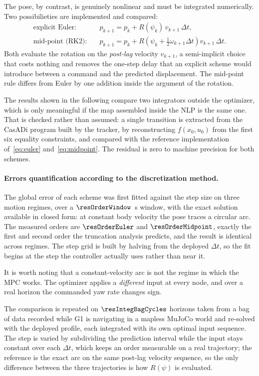 \documentclass[11pt,a4paper]{article}
\begin{document}
The pose, by contrast, is genuinely nonlinear and must be integrated numerically. Two possibilieties are implemented and compared:
\begin{align}
  \text{explicit Euler:}\quad & p_{k+1} = p_k + R(\psi_k)\,v_{k+1}\,\Delta t,
  \label{eq:euler}\\
  \text{mid-point (RK2):}\quad & p_{k+1} = p_k + R\!\left(\psi_k+\tfrac{1}{2}\omega_{k+1}\Delta t\right)v_{k+1}\,\Delta t.
  \label{eq:midpoint}
\end{align}
Both evaluate the rotation on the \emph{post-lag} velocity $v_{k+1}$, a semi-implicit choice that costs
nothing and removes the one-step delay that an explicit scheme would introduce between a command and the predicted
displacement. The mid-point rule differs from Euler by one addition inside the argument of the rotation.

The results shown in the following compare two integrators
outside the optimizer, which is only meaningful if the map assembled inside the NLP is the same one. That is
checked rather than assumed: a single transition is extracted from the CasADi program built by the tracker,
by reconstructing $f(x_0,u_0)$ from the first six equality constraints, and compared with the reference
implementation of~\eqref{eq:euler} and~\eqref{eq:midpoint}. The residual is zero to machine precision for both schemes.

\paragraph{Errors quantification according to the discretization method.} The global error of each scheme was first fitted against the step size
on three motion regimes, over a $\resOrderWindow$~s window, with the exact solution available in closed form:
at constant body velocity the pose traces a circular arc. The measured orders are $\resOrderEuler$ and
$\resOrderMidpoint$, exactly the first and second order the truncation analysis predicts, and the result is
identical across regimes. The step grid is built by halving from the deployed $\Delta t$, so the fit begins
at the step the controller actually uses rather than near it.

It is worth noting that a constant-velocity
arc is not the regime in which the MPC works. The optimizer applies a \emph{different} input at every node, and over a real horizon the commanded yaw rate changes sign.

The comparison is repeated on
$\resIntegBagCycles$ horizons taken from a bag of data recorded while G1 is navigating in a mapless MuJoCo world and re-solved with the deployed
profile, each integrated with its own optimal input sequence. The step is varied by subdividing the
prediction interval while the input stays constant over each $\Delta t$, which keeps an order measurable on a
real trajectory; the reference is the exact arc on the same post-lag velocity sequence, so the only
difference between the three trajectories is how $R(\psi)$ is evaluated.
\end{document}
